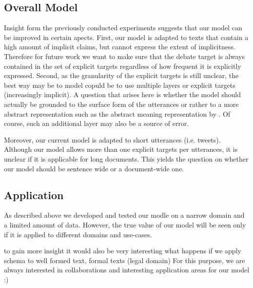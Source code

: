 \documentclass[11pt]{article}
\begin{document}
\subsection{Overall Model}
Insight form the previously conducted experiments suggests that our model can be improved in certain apects.
First, our model is adapted to texts that contain a high amount of implicit claims, but cannot express  the extent of implicitness.
Therefore for future work we want to make sure that the debate target is always contained in the set of explicit targets regardless of how frequent it is explicitly expressed.
Second, as the granularity of the explicit targets is still unclear, the best way may be to model copuld be to use multiple layers or explicit targets (increasingly implicit).
A question that arises here is whether the model should actually be grounded to the surface form of the utterances or rather to a more abstract representation such as the abstract meaning representation by .
Of course, such an additional layer may also be a source of error.

Moreover, our current model is adapted to short utterances (i.e. tweets). 
Although our model allows more than one explicit targets per utterances, it is unclear if it is applicable for long documents.
This yields the question on whether our model should be sentence wide or a document-wide one.

\subsection{Application}
As described above we developed and tested our modle on a narrow domain and a limited amount of data.
However, the true value of our model will be seen only if it is applied to different domains and use-cases.

to gain more insight it would also be very interesting what happens if we apply schema to well formed text, formal texts (legal domain)
For this purpose, we are always interested in collaborations and interesting application areas for our model :)



%
%


\end{document}
